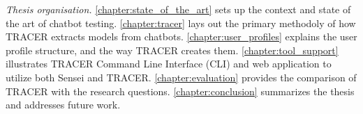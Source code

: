 \textit{Thesis organisation.}
\autoref{chapter:state_of_the_art} sets up the context and state of the art of chatbot testing.
\autoref{chapter:tracer} lays out the primary methodoly of how \ac{TRACER} extracts models from chatbots.
\autoref{chapter:user_profiles} explains the user profile structure, and the way \ac{TRACER} creates them.
\autoref{chapter:tool_support} illustrates \ac{TRACER} Command Line Interface (CLI) and web application to utilize both Sensei and \ac{TRACER}.
\autoref{chapter:evaluation} provides the comparison of \ac{TRACER} with the research questions.
\autoref{chapter:conclusion} summarizes the thesis and addresses future work.




%
%
%
%
%
%
